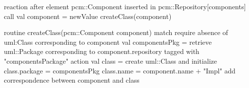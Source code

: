 reaction {
	after element pcm::Component inserted in pcm::Repository[components]
	call {
		val component = newValue
		createClass(component)
	}
}

routine createClass(pcm::Component component) {
	match {
		require absence of uml:Class
			corresponding to component
		val componentsPkg = retrieve uml::Package
			corresponding to component.repository
			tagged with "componentsPackage"
	}
	action {
		val class = create uml::Class and initialize {
			class.package = componentsPkg
			class.name = component.name + "Impl"
		}
		add correspondence between component and class
	}
}